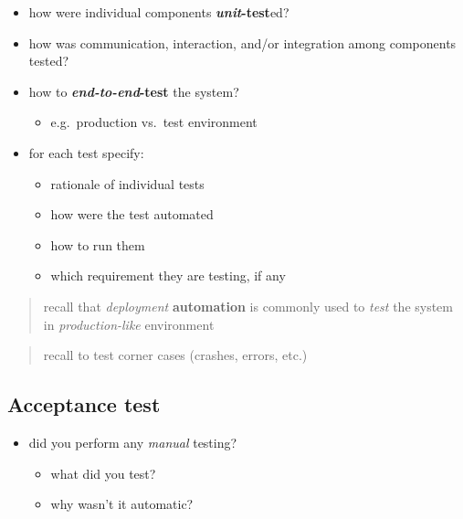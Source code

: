 \documentclass{scrartcl}
\begin{document}
\begin{itemize}
    \item how were individual components \textbf{\emph{unit}-test}ed?
    \item how was communication, interaction, and/or integration among
          components tested?
    \item how to \textbf{\emph{end-to-end}-test} the system?

          \begin{itemize}
              \item e.g.~production vs.~test environment
          \end{itemize}
    \item for each test specify:

          \begin{itemize}
              \item rationale of individual tests
              \item how were the test automated
              \item how to run them
              \item which requirement they are testing, if any
          \end{itemize}
\end{itemize}

\begin{quote}
    recall that \emph{deployment} \textbf{automation} is commonly used to
    \emph{test} the system in \emph{production-like} environment
\end{quote}

\begin{quote}
    recall to test corner cases (crashes, errors, etc.)
\end{quote}

\subsection{Acceptance test}\label{acceptance-test}

\begin{itemize}
    \item did you perform any \emph{manual} testing?

          \begin{itemize}
              \item what did you test?
              \item why wasn't it automatic?
          \end{itemize}
\end{itemize}
\end{document}
